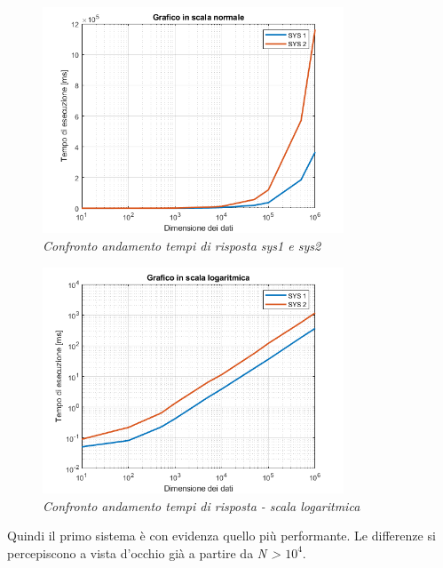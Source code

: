 \begin{figure}[H]
	\centering
	\includegraphics[width=0.8\textwidth]{img/hw0/grafico_naturale.png}
	\caption{\textit{Confronto andamento tempi di risposta sys1 e sys2}}
\end{figure}
\begin{figure}[H]
	\centering
	\includegraphics[width=0.8\textwidth]{img/hw0/grafico_log.png}
	\caption{\textit{Confronto andamento tempi di risposta - scala logaritmica}}
\end{figure}
Quindi il primo sistema è con evidenza quello più performante. Le differenze si percepiscono a vista d'occhio già a partire da \textit{N > $10^4$}.